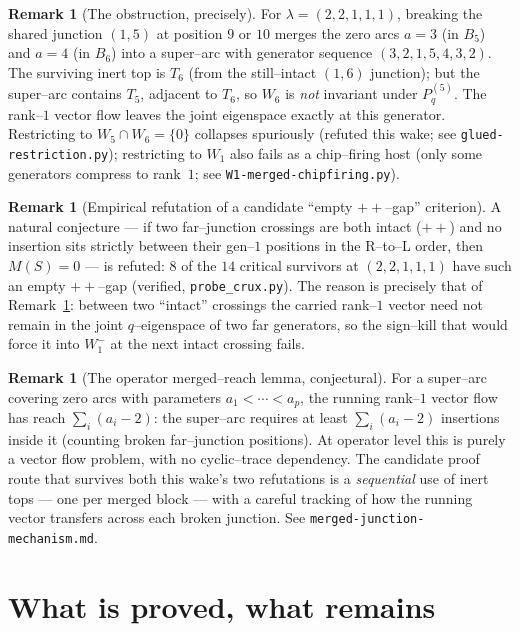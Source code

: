 \documentclass[11pt]{article}
\theoremstyle{definition}
\newtheorem{remark}[theorem]{Remark}
\newcommand{\Pq}{P_{q}}
\newcommand{\la}{\lambda}
\newcommand{\W}{W}
\begin{document}
\begin{remark}[The obstruction, precisely]\label{rem:obstr}
For $\la=(2,2,1,1,1)$, breaking the shared junction $(1,5)$ at position $9$ or
$10$ merges the zero arcs $a=3$ (in $B_5$) and $a=4$ (in $B_6$) into a super--arc
with generator sequence $(3,2,1,5,4,3,2)$. The surviving inert top is $T_6$
\textup(from the still--intact $(1,6)$ junction\textup); but the super--arc
contains $T_5$, adjacent to $T_6$, so $\W_6$ is \emph{not} invariant under
$\Pq^{(5)}$. The rank--$1$ vector flow leaves the joint eigenspace exactly at
this generator. Restricting to $\W_5\cap\W_6=\{0\}$ collapses spuriously
\textup(refuted this wake; see \texttt{glued-restriction.py}\textup); restricting
to $\W_1$ also fails as a chip--firing host \textup(only some generators
compress to rank~$1$; see \texttt{W1-merged-chipfiring.py}\textup).
\end{remark}

\begin{remark}[Empirical refutation of a candidate ``empty $++$--gap'' criterion]
A natural conjecture --- if two far--junction crossings are both intact
\textup($++$\textup) and no insertion sits strictly between their gen--$1$
positions in the R--to--L order, then $M(S)=0$ --- is refuted: $8$ of the
$14$ critical survivors at $(2,2,1,1,1)$ have such an empty $++$--gap
\textup(verified, \texttt{probe\_crux.py}\textup). The reason is precisely that
of Remark~\ref{rem:obstr}: between two ``intact'' crossings the carried
rank--$1$ vector need not remain in the joint $q$--eigenspace of two far
generators, so the sign--kill that would force it into $\W_1^-$ at the next
intact crossing fails.
\end{remark}

\begin{remark}[The operator merged--reach lemma, conjectural]
For a super--arc covering zero arcs with parameters $a_1<\cdots<a_p$, the
running rank--$1$ vector flow has reach $\sum_i(a_i-2)$: the super--arc
requires at least $\sum_i(a_i-2)$ insertions inside it (counting broken
far--junction positions). At operator level this is purely a vector
flow problem, with no cyclic--trace dependency. The candidate proof route
that survives both this wake's two refutations is a \emph{sequential} use of
inert tops --- one per merged block --- with a careful tracking of how the
running vector transfers across each broken junction. See
\texttt{merged-junction-mechanism.md}.
\end{remark}

\section{What is proved, what remains}
\end{document}

